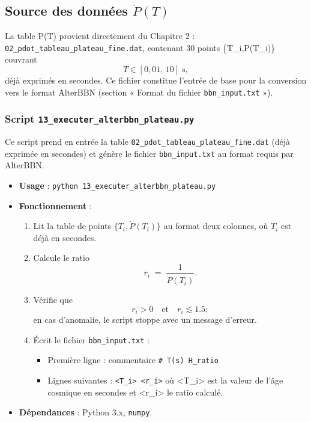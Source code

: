 \subsection{Source des données \(\dot P(T)\)}

La table \dot P(T) provient directement du Chapitre 2 :  
\texttt{02_pdot_tableau_plateau_fine.dat}, contenant 30 points \{T_i,\dot P(T_i)\} couvrant  
\[
  T\in[0{,}01,\,10]\;\mathrm{s},
\]
déjà exprimés en secondes.
Ce fichier constitue l’entrée de base pour la conversion vers le format AlterBBN (section « Format du fichier \texttt{bbn\_input.txt} »).

\subsubsection{Script \texttt{13\_executer\_alterbbn\_plateau.py}}

Ce script prend en entrée la table \texttt{02\_pdot\_tableau\_plateau\_fine.dat} (déjà exprimée en secondes) et génère le fichier \texttt{bbn\_input.txt} au format requis par AlterBBN.

\begin{itemize}
  \item \textbf{Usage} :  
    \verb|python 13_executer_alterbbn_plateau.py|
  
  \item \textbf{Fonctionnement} :  
    \begin{enumerate}
      \item Lit la table de points \(\{T_i,\dot P(T_i)\}\) au format deux colonnes, où \(T_i\) est déjà en secondes.
      \item Calcule le ratio  
        \[
          r_i \;=\;\frac{1}{\dot P(T_i)}.
        \]
      \item Vérifie que  
        \[
          r_i > 0
          \quad\text{et}\quad
          r_i \lesssim 1.5;
        \]
        en cas d’anomalie, le script stoppe avec un message d’erreur.
      \item Écrit le fichier \texttt{bbn\_input.txt} :
        \begin{itemize}
          \item Première ligne : commentaire
            \verb|# T(s) H_ratio|
          \item Lignes suivantes :  
            \verb|<T_i> <r_i>|  
            où <T_i> est la valeur de l’âge cosmique en secondes et <r_i> le ratio calculé.
        \end{itemize}
    \end{enumerate}

  \item \textbf{Dépendances} :  
    Python 3.x, \texttt{numpy}.
\end{itemize}

